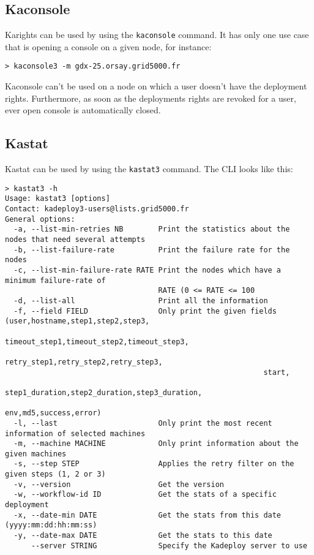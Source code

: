 \documentclass[a4wide,10pt,oneside]{book}
\begin{document}
\subsection{Kaconsole}\label{sec:kaconsole}
Karights can be used by using the \texttt{kaconsole} command. It has only one use case that is opening a console on a given node, for instance:
\begin{verbatim}
> kaconsole3 -m gdx-25.orsay.grid5000.fr
\end{verbatim}

Kaconsole can't be used on a node on which a user doesn't have the deployment rights. Furthermore, as soon as the deployments rights are revoked for a user, ever open console is automatically closed.

\subsection{Kastat}\label{sec:kastat}
Kastat can be used by using the \texttt{kastat3} command. The CLI looks like this:
\begin{small}
\begin{verbatim}
> kastat3 -h
Usage: kastat3 [options]
Contact: kadeploy3-users@lists.grid5000.fr
General options:
  -a, --list-min-retries NB        Print the statistics about the nodes that need several attempts
  -b, --list-failure-rate          Print the failure rate for the nodes
  -c, --list-min-failure-rate RATE Print the nodes which have a minimum failure-rate of
                                   RATE (0 <= RATE <= 100
  -d, --list-all                   Print all the information
  -f, --field FIELD                Only print the given fields (user,hostname,step1,step2,step3,
                                                           timeout_step1,timeout_step2,timeout_step3,
                                                           retry_step1,retry_step2,retry_step3,
                                                           start,
                                                           step1_duration,step2_duration,step3_duration,
                                                           env,md5,success,error)
  -l, --last                       Only print the most recent information of selected machines
  -m, --machine MACHINE            Only print information about the given machines
  -s, --step STEP                  Applies the retry filter on the given steps (1, 2 or 3)
  -v, --version                    Get the version
  -w, --workflow-id ID             Get the stats of a specific deployment
  -x, --date-min DATE              Get the stats from this date (yyyy:mm:dd:hh:mm:ss)
  -y, --date-max DATE              Get the stats to this date
      --server STRING              Specify the Kadeploy server to use
\end{verbatim}
\end{small}
\end{document}
